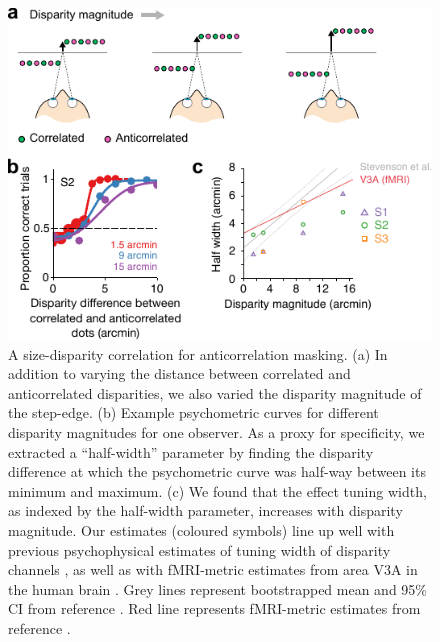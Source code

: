 \begin{figure}
  \centering
  \includegraphics{Fig4}
  \caption[A size-disparity correlation for anticorrelation masking.]{A size-disparity correlation for anticorrelation masking. (a) In addition to varying the distance between correlated and anticorrelated disparities, we also varied the disparity magnitude of the step-edge. (b) Example psychometric curves for different disparity magnitudes for one observer. As a proxy for specificity, we extracted a ``half-width'' parameter by finding the disparity difference at which the psychometric curve was half-way between its minimum and maximum. (c) We found that the effect tuning width, as indexed by the half-width parameter, increases with disparity magnitude. Our estimates (coloured symbols) line up well with previous psychophysical estimates of tuning width of disparity channels \cite{Stevenson:1992kx}, as well as with fMRI-metric estimates from area V3A in the human brain \cite{Goncalves:2015aa}. Grey lines represent bootstrapped mean and 95\% CI from reference \cite{Stevenson:1992kx}. Red line represents fMRI-metric estimates from reference \cite{Goncalves:2015aa}.}
  \label{fig:c2f4}
\end{figure}


